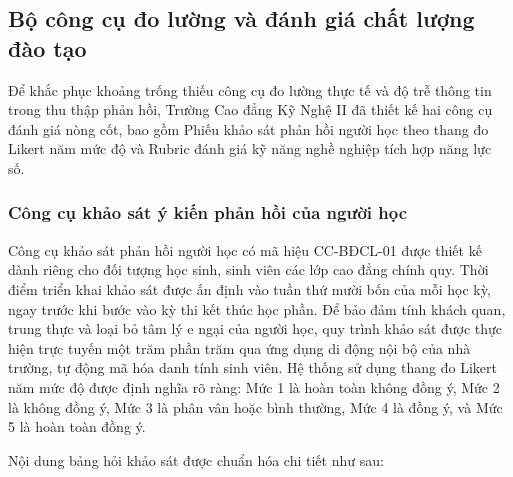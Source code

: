 \subsection{Bộ công cụ đo lường và đánh giá chất lượng đào tạo}

Để khắc phục khoảng trống thiếu công cụ đo lường thực tế và độ trễ thông tin trong thu thập phản hồi, Trường Cao đẳng Kỹ Nghệ II đã thiết kế hai công cụ đánh giá nòng cốt, bao gồm Phiếu khảo sát phản hồi người học theo thang đo Likert năm mức độ và Rubric đánh giá kỹ năng nghề nghiệp tích hợp năng lực số.

\subsubsection{Công cụ khảo sát ý kiến phản hồi của người học}

Công cụ khảo sát phản hồi người học có mã hiệu CC-BĐCL-01 được thiết kế dành riêng cho đối tượng học sinh, sinh viên các lớp cao đẳng chính quy. Thời điểm triển khai khảo sát được ấn định vào tuần thứ mười bốn của mỗi học kỳ, ngay trước khi bước vào kỳ thi kết thúc học phần. Để bảo đảm tính khách quan, trung thực và loại bỏ tâm lý e ngại của người học, quy trình khảo sát được thực hiện trực tuyến một trăm phần trăm qua ứng dụng di động nội bộ của nhà trường, tự động mã hóa danh tính sinh viên. Hệ thống sử dụng thang đo Likert năm mức độ được định nghĩa rõ ràng: Mức 1 là hoàn toàn không đồng ý, Mức 2 là không đồng ý, Mức 3 là phân vân hoặc bình thường, Mức 4 là đồng ý, và Mức 5 là hoàn toàn đồng ý.

Nội dung bảng hỏi khảo sát được chuẩn hóa chi tiết như sau:

